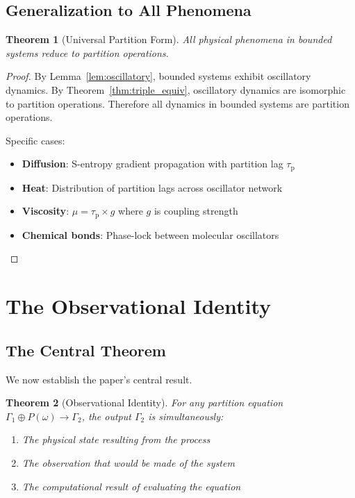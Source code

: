\documentclass[aps,prd,twocolumn,superscriptaddress,floatfix,nofootinbib]{revtex4-2}
\newtheorem{theorem}{Theorem}[section]
\theoremstyle{remark}
\newcommand{\Pop}{P}
\newcommand{\Gstate}{\Gamma}
\newcommand{\taulag}{\tau_{\mathrm{p}}}
\begin{document}
\subsection{Generalization to All Phenomena}

\begin{theorem}[Universal Partition Form]
\label{thm:universal_partition}
All physical phenomena in bounded systems reduce to partition operations.
\end{theorem}

\begin{proof}
By Lemma~\ref{lem:oscillatory}, bounded systems exhibit oscillatory dynamics. By Theorem~\ref{thm:triple_equiv}, oscillatory dynamics are isomorphic to partition operations. Therefore all dynamics in bounded systems are partition operations.

Specific cases:
\begin{itemize}
\item \textbf{Diffusion}: S-entropy gradient propagation with partition lag $\taulag$
\item \textbf{Heat}: Distribution of partition lags across oscillator network
\item \textbf{Viscosity}: $\mu = \taulag \times g$ where $g$ is coupling strength
\item \textbf{Chemical bonds}: Phase-lock between molecular oscillators
\end{itemize}
\end{proof}

\section{The Observational Identity}
\label{sec:observational}

\subsection{The Central Theorem}

We now establish the paper's central result.

\begin{theorem}[Observational Identity]
\label{thm:observational}
For any partition equation $\Gstate_1 \oplus \Pop(\omega) \to \Gstate_2$, the output $\Gstate_2$ is simultaneously:
\begin{enumerate}
\item[(P)] The physical state resulting from the process
\item[(O)] The observation that would be made of the system
\item[(C)] The computational result of evaluating the equation
\end{enumerate}
\end{theorem}
\end{document}

